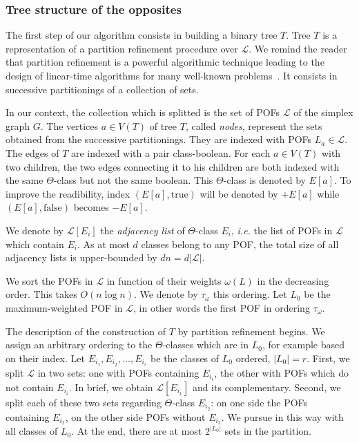 \documentclass[a4paper,UKenglish,numberwithinsect,cleveref, autoref]{lipics-v2021}
\newcommand{\card}[1]{\left| #1 \right|}
\begin{document}
\subsubsection{Tree structure of the opposites} \label{subsubsec:tree_opp}

The first step of our algorithm consists in building a binary tree $T$. Tree $T$ is a representation of a partition refinement procedure over $\mathcal{L}$. We remind the reader that partition refinement is a powerful algorithmic technique leading to the design of linear-time algorithms for many well-known problems~\cite{HaPaVi99,PaTa87}. It consists in successive partitionings of a collection of sets.

In our context, the collection which is splitted is the set of POFs $\mathcal{L}$ of the simplex graph $G$. The vertices $a \in V(T)$ of tree $T$, called \textit{nodes}, represent the sets obtained from the successive partitionings. They are indexed with POFs $L_a \in \mathcal{L}$. The edges of $T$ are indexed with a pair class-boolean. For each $a \in V(T)$ with two children, the two edges connecting it to his children are both indexed with the same $\Theta$-class but not the same boolean. This $\Theta$-class is denoted by $E\left[a\right]$. To improve the readibility, index $(E\left[a\right],\mbox{true})$ will be denoted by $+E\left[a\right]$ while $(E\left[a\right],\mbox{false})$ becomes $-E\left[a\right]$.

We denote by $\mathcal{L}\left[E_i\right]$ the \textit{adjacency list} of $\Theta$-class $E_i$, {\em i.e.} the list of POFs in $\mathcal{L}$ which contain $E_i$. As at most $d$ classes belong to any POF, the total size of all adjacency lists is upper-bounded by $dn = d\card{\mathcal{L}}$.

We sort the POFs in $\mathcal{L}$ in function of their weights $\omega(L)$ in the decreasing order. This takes $O(n\log n)$. We denote by $\tau_{\omega}$ this ordering. Let $L_0$ be the maximum-weighted POF in $\mathcal{L}$, in other words the first POF in ordering $\tau_{\omega}$.

The description of the construction of $T$ by partition refinement begins. We assign an arbitrary ordering to the $\Theta$-classes which are in $L_0$, for example based on their index. Let $E_{i_1}, E_{i_2},\ldots, E_{i_r}$ be the classes of $L_0$ ordered, $\card{L_0} = r$. First, we split $\mathcal{L}$ in two sets: one with POFs containing $E_{i_i}$, the other with POFs which do not contain $E_{i_i}$. In brief, we obtain $\mathcal{L}\left[E_{i_1}\right]$ and its complementary. Second, we split each of these two sets regarding $\Theta$-class $E_{i_2}$: on one side the POFs containing $E_{i_2}$, on the other side POFs without $E_{i_2}$. We pursue in this way with all classes of $L_0$. At the end, there are at most $2^{\card{L_0}}$ sets in the partition.
\end{document}
